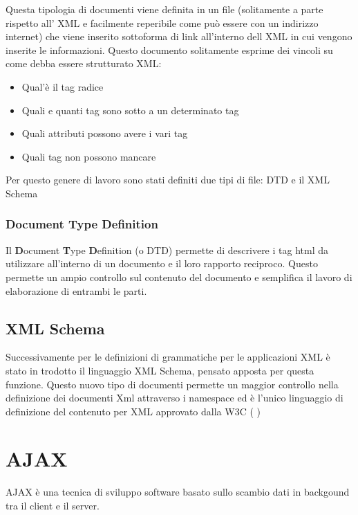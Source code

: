\documentclass{report}
\begin{document}
Questa tipologia di documenti viene definita in un file (solitamente a parte rispetto all' XML e facilmente reperibile come può essere con un indirizzo internet) che viene inserito sottoforma di link all'interno dell XML in cui vengono inserite le informazioni. Questo documento solitamente esprime dei vincoli su come debba essere strutturato XML: 
\begin{itemize}
\item Qual'è il tag radice
\item Quali e quanti tag sono sotto a un determinato tag
\item Quali attributi possono avere i vari tag
\item Quali tag non possono mancare 
\end{itemize}

Per questo genere di lavoro sono stati definiti due tipi di file: DTD e il XML Schema 

\subsection{Document Type Definition}
Il \textbf{D}ocument \textbf{T}ype \textbf{D}efinition (o DTD) permette di descrivere i tag html da utilizzare all'interno di un documento e il loro rapporto reciproco. Questo permette un ampio controllo sul contenuto del documento e semplifica il lavoro di elaborazione di entrambi le parti. 

\section{XML Schema}
Successivamente per le definizioni di grammatiche per le applicazioni XML è stato in trodotto il linguaggio XML Schema, pensato apposta per questa funzione. Questo nuovo tipo di documenti permette un maggior controllo nella definizione dei documenti Xml attraverso i namespace ed è l'unico linguaggio di definizione del contenuto per XML approvato dalla W3C (\cite{site:w3cxmlschame} )


\chapter{AJAX}
AJAX è una tecnica di sviluppo software basato sullo scambio dati in backgound tra il client e il server. 


\newpage
\section*{\refname}
\printbibliography[heading=libri, category=libri]
\printbibliography[heading=web, category=web]
\end{document}
